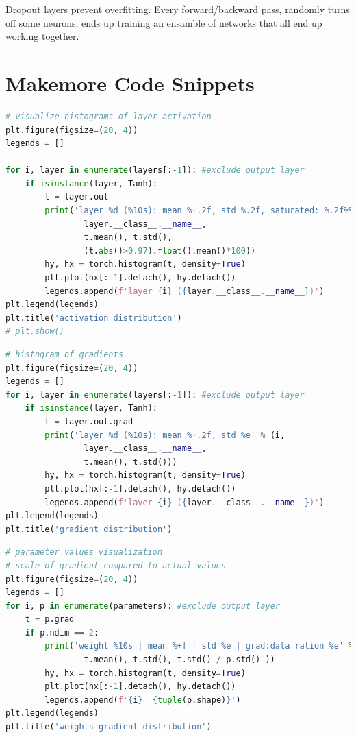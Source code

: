 \documentclass{article}
\begin{document}
Dropout layers prevent overfitting.  Every forward/backward pass, randomly turns off some neurons, ends up training an ensamble of networks that all end up working together.

\section*{Makemore Code Snippets}
\begin{lstlisting}[language=Python, caption={Activation graph with matplotlib}, label={code:activation-graph}]    
# visualize histograms of layer activation
plt.figure(figsize=(20, 4))
legends = []

for i, layer in enumerate(layers[:-1]): #exclude output layer
    if isinstance(layer, Tanh):
        t = layer.out 
        print('layer %d (%10s): mean %+.2f, std %.2f, saturated: %.2f%%' % (i, 
                layer.__class__.__name__, 
                t.mean(), t.std(), 
                (t.abs()>0.97).float().mean()*100))
        hy, hx = torch.histogram(t, density=True)
        plt.plot(hx[:-1].detach(), hy.detach())
        legends.append(f'layer {i} ({layer.__class__.__name__})')
plt.legend(legends)
plt.title('activation distribution')
# plt.show()
\end{lstlisting}

\begin{lstlisting}[language=Python, caption={Gradients of $\tanh$ layers with matplotlib}, label={code:grad-graph}]
    # histogram of gradients
plt.figure(figsize=(20, 4))
legends = []
for i, layer in enumerate(layers[:-1]): #exclude output layer
    if isinstance(layer, Tanh):
        t = layer.out.grad
        print('layer %d (%10s): mean %+.2f, std %e' % (i, 
                layer.__class__.__name__, 
                t.mean(), t.std()))
        hy, hx = torch.histogram(t, density=True)
        plt.plot(hx[:-1].detach(), hy.detach())
        legends.append(f'layer {i} ({layer.__class__.__name__})')
plt.legend(legends)
plt.title('gradient distribution')
\end{lstlisting}

\begin{lstlisting}[language=Python, caption={Scale between gradients and values of parameters}, label={code:grad-scale-graph}]
# parameter values visualization
# scale of gradient compared to actual values
plt.figure(figsize=(20, 4))
legends = []
for i, p in enumerate(parameters): #exclude output layer
    t = p.grad 
    if p.ndim == 2:
        print('weight %10s | mean %+f | std %e | grad:data ration %e' % (tuple(p.shape), 
                t.mean(), t.std(), t.std() / p.std() ))
        hy, hx = torch.histogram(t, density=True)
        plt.plot(hx[:-1].detach(), hy.detach())
        legends.append(f'{i}  {tuple(p.shape)}')
plt.legend(legends)
plt.title('weights gradient distribution')
\end{lstlisting}
\end{document}
